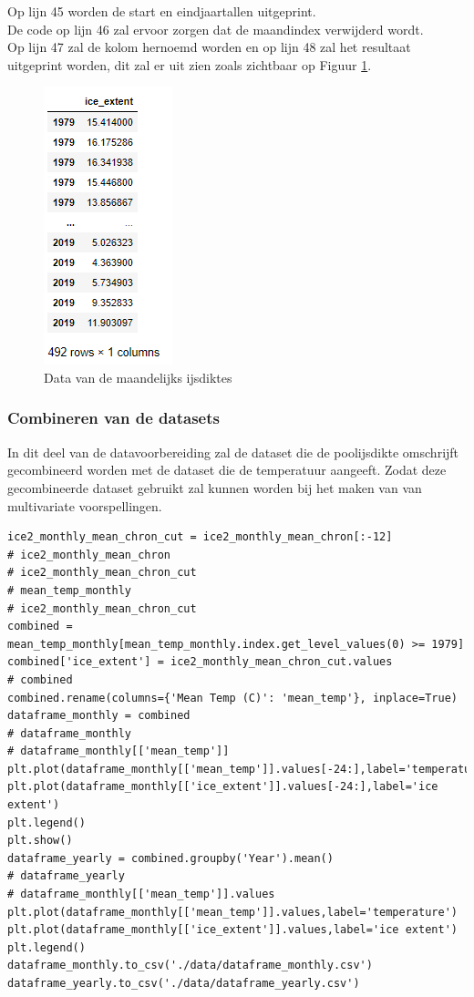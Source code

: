Op lijn 45 worden de start en eindjaartallen uitgeprint. \\
De code op lijn 46 zal ervoor zorgen dat de maandindex verwijderd wordt.\\
Op lijn 47 zal de kolom hernoemd worden en op lijn 48 zal het resultaat uitgeprint worden, dit zal er uit zien zoals zichtbaar op Figuur \ref{fig:iceextentdata}.

\begin{figure}
    \centering
    \caption{Data van de maandelijks ijsdiktes}
    \label{fig:iceextentdata}
    \includegraphics[width=0.3\linewidth]{ice_extent_data}
\end{figure}

\subsubsection{Combineren van de datasets}

In dit deel van de datavoorbereiding zal de dataset die de poolijsdikte omschrijft gecombineerd worden met de dataset die de temperatuur aangeeft. Zodat deze gecombineerde dataset gebruikt zal kunnen worden bij het maken van van multivariate voorspellingen.

\begin{verbatim}
ice2_monthly_mean_chron_cut = ice2_monthly_mean_chron[:-12]
# ice2_monthly_mean_chron
# ice2_monthly_mean_chron_cut
# mean_temp_monthly
# ice2_monthly_mean_chron_cut
combined = mean_temp_monthly[mean_temp_monthly.index.get_level_values(0) >= 1979]
combined['ice_extent'] = ice2_monthly_mean_chron_cut.values
# combined
combined.rename(columns={'Mean Temp (C)': 'mean_temp'}, inplace=True)
dataframe_monthly = combined
# dataframe_monthly
# dataframe_monthly[['mean_temp']]
plt.plot(dataframe_monthly[['mean_temp']].values[-24:],label='temperature')
plt.plot(dataframe_monthly[['ice_extent']].values[-24:],label='ice extent')
plt.legend()
plt.show()
dataframe_yearly = combined.groupby('Year').mean()
# dataframe_yearly
# dataframe_monthly[['mean_temp']].values
plt.plot(dataframe_monthly[['mean_temp']].values,label='temperature')
plt.plot(dataframe_monthly[['ice_extent']].values,label='ice extent')
plt.legend()
dataframe_monthly.to_csv('./data/dataframe_monthly.csv')
dataframe_yearly.to_csv('./data/dataframe_yearly.csv')
\end{verbatim}

